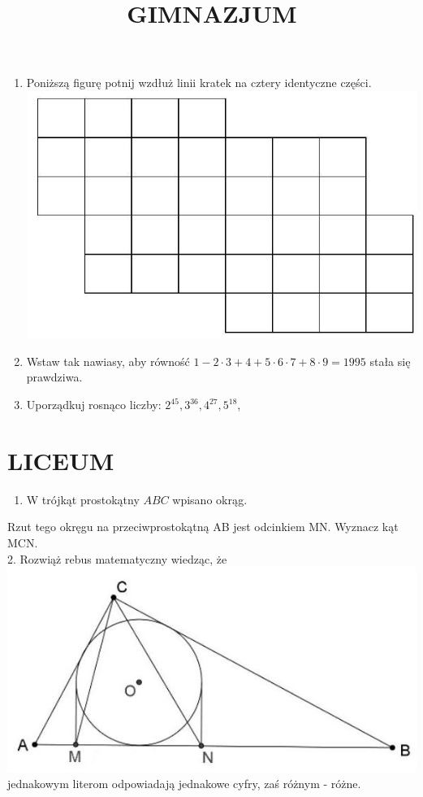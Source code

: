 \documentclass[10pt]{article}
\title{GIMNAZJUM }
\author{}
\date{}
\begin{document}
\maketitle
\begin{enumerate}
  \item Poniższą figurę potnij wzdłuż linii kratek na cztery identyczne części.\\
\includegraphics[max width=\textwidth, center]{2024_11_21_a1e3cfbefdcf841fc346g-1}
  \item Wstaw tak nawiasy, aby równość \(1-2 \cdot 3+4+5 \cdot 6 \cdot 7+8 \cdot 9=1995\) stała się prawdziwa.
  \item Uporządkuj rosnąco liczby: \(2^{45}, 3^{36}, 4^{27}, 5^{18}\),
\end{enumerate}

\section*{LICEUM}
\begin{enumerate}
  \item W trójkąt prostokątny \(A B C\) wpisano okrąg.
\end{enumerate}

Rzut tego okręgu na przeciwprostokątną AB jest odcinkiem MN. Wyznacz kąt MCN.\\
2. Rozwiąż rebus matematyczny wiedząc, że\\
\includegraphics[max width=\textwidth, center]{2024_11_21_a1e3cfbefdcf841fc346g-1(1)}\\
jednakowym literom odpowiadają jednakowe cyfry, zaś różnym - różne.
\end{document}
